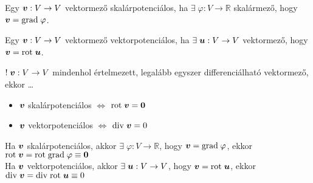 \documentclass[main.tex]{subfiles}
\begin{document}

Egy $\bm{v}: V \rightarrow V$ vektormező skalárpotenciálos,
ha $\exists \; \varphi : V \rightarrow \mathbb{R}$ skalármező,
hogy $\bm{v} = \mathrm{grad} \; \varphi$.




Egy $\bm{v}: V \rightarrow V$ vektormező vektorpotenciálos,
ha $\exists \; \bm{u} : V \rightarrow V$ vektormező,
hogy $\bm{v} = \mathrm{rot} \; \bm{u}$.




$! \; \bm{v}: V \rightarrow V$ mindenhol értelmezett,
legalább egyszer differenciálható vektormező, ekkor \dots
\begin{itemize}
  \item $\bm{v}$ skalárpotenciálos $\Leftrightarrow$
        $\mathrm{rot} \; \bm{v} = \bm{0}$

  \item $\bm{v}$ vektorpotenciálos $\Leftrightarrow$
        $\mathrm{div} \; \bm{v} = 0$
\end{itemize}




Ha $\bm{v}$ skalárpotenciálos, akkor
$\exists \; \varphi : V \rightarrow \mathbb{R}$,
hogy $\bm{v} = \mathrm{grad} \; \varphi$, ekkor
$\mathrm{rot} \; \bm{v} = \mathrm{rot} \; \mathrm{grad} \; \varphi \equiv \bm{0}$
\\[.33em]
Ha $\bm{v}$ vektorpotenciálos, akkor
$\exists \; \bm{u} : V \rightarrow V$,
hogy $\bm{v} = \mathrm{rot} \; \bm{u}$, ekkor
$\mathrm{div} \; \bm{v} = \mathrm{div} \; \mathrm{rot} \; \bm{u} \equiv 0$



\end{document}
